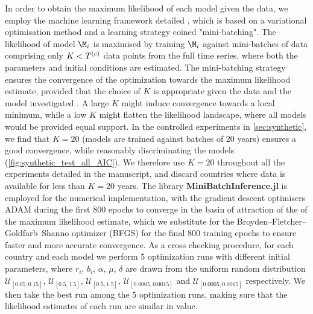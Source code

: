 In order to obtain the maximum likelihood of each model given the data, we employ the machine learning framework detailed \citep{Boussange2022a}, which is based on a variational optimisation method and a learning strategy coined "mini-batching". The likelihood of model $\M_i$ is maximised by training $\M_i$ against mini-batches of data comprising only $K < T^{(c)}$ data points from the full time series, where both the parameters and initial conditions are estimated.
% 
The mini-batching strategy ensures the convergence of the optimization towards the maximum likelihood estimate, provided that the choice of $K$ is appropriate given the data and the model investigated \citep{Boussange2022a}. 
% 
A large $K$ might induce convergence towards a local minimum, while a low $K$ might flatten the likelihood landscape, where all models would be provided equal support. 
% 
In the controlled experiments in \cref{sec:synthetic}, we find that $K=20$ (models are trained against batches of 20 years) ensures a good convergence, while reasonably discriminating the models (\cref{fig:synthetic_test_all_AIC}). We therefore use $K=20$ throughout all the experiments detailed in the manuscript, and discard countries where data is available for less than $K = 20$ years.
% 
The library \textbf{MiniBatchInference.jl} \citep{Boussange2022a} is employed for the numerical implementation, with the gradient descent optimisers ADAM \citep{Kingma2014} during the first 800 epochs to converge in the basin of attraction of the of the maximum likelihood estimate, which we substitute for the Broyden–Fletcher–Goldfarb–Shanno optimizer (BFGS) \citep{fletcher2013practical} for the final 800 training epochs to ensure faster and more accurate convergence.
% 
As a cross checking procedure, for each country and each model we perform 5 optimization runs with different initial parameters, where $r_i$, $b_i$, $\alpha$, $\mu$, $\delta$ are drawn from the uniform random distribution $\mathcal{U}_{[0.05, 0.15]}$, $\mathcal{U}_{[0.5,1.5]}$, $\mathcal{U}_{[0.5,1.5]}$, $\mathcal{U}_{[0.0005, 0.0015]}$ and $\mathcal{U}_{[0.0005, 0.0015]}$ respectively.
% 
We then take the best run among the 5 optimization runs, making sure that the likelihood estimates of each run are similar in value.
% 

